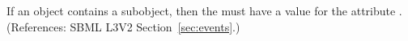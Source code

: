 If an \Event object contains a \Delay subobject, then the \Event must have
a value for the attribute .  (References:
SBML L3V2 Section~\ref{sec:events}.)
